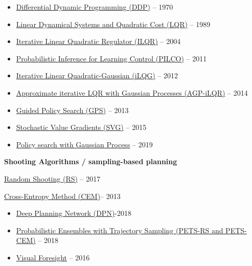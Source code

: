 \documentclass[
  a4paper,
  DIV=11,
  numbers=noendperiod]{scrreprt}
\providecommand{\tightlist}{%
  \setlength{\itemsep}{0pt}\setlength{\parskip}{0pt}}\usepackage{longtable,booktabs,array}
\begin{document}
\begin{itemize}
\tightlist
\item
  \href{https://www.jstor.org/stable/3613752?origin=crossref&seq=1}{Differential
  Dynamic Programming (DDP)} -- 1970
\item
  \href{http://users.cecs.anu.edu.au/~john/papers/BOOK/B03.PDF}{Linear
  Dynamical Systems and Quadratic Cost (LQR)} -- 1989
\item
  \href{https://homes.cs.washington.edu/~todorov/papers/LiICINCO04.pdf}{Iterative
  Linear Quadratic Regulator (ILQR)} -- 2004
\item
  \href{https://www.ias.informatik.tu-darmstadt.de/uploads/Publications/Deisenroth_ICML_2011.pdf}{Probabilistic
  Inference for Learning Control (PILCO)} -- 2011
\item
  \href{https://homes.cs.washington.edu/~todorov/papers/TassaIROS12.pdf}{Iterative
  Linear Quadratic-Gaussian (iLQG)} -- 2012
\item
  \href{http://citeseerx.ist.psu.edu/viewdoc/download?doi=10.1.1.716.4271&rep=rep1&type=pdf}{Approximate
  iterative LQR with Gaussian Processes (AGP-iLQR)} -- 2014
\item
  \href{https://graphics.stanford.edu/projects/gpspaper/gps_full.pdf}{Guided
  Policy Search (GPS)} -- 2013
\item
  \href{https://arxiv.org/abs/1510.09142}{Stochastic Value Gradients
  (SVG)} -- 2015
\item
  \href{https://dl.acm.org/doi/10.5555/3306127.3331874}{Policy search
  with Gaussian Process} -- 2019
\end{itemize}

\textbf{Shooting Algorithms / sampling-based planning}

\href{https://arxiv.org/pdf/1708.02596.pdf}{Random Shooting (RS)} --
2017

\href{https://www.sciencedirect.com/science/article/pii/B9780444538598000035}{Cross-Entropy
Method (CEM)}-- 2013

\begin{itemize}
\tightlist
\item
  \href{https://arxiv.org/abs/1811.04551}{Deep Planning Network
  (DPN)}-2018
\item
  \href{https://arxiv.org/abs/1805.12114}{Probabilistic Ensembles with
  Trajectory Sampling (PETS-RS and PETS-CEM)} -- 2018
\item
  \href{https://arxiv.org/abs/1610.00696}{Visual Foresight} -- 2016
\end{itemize}
\end{document}
